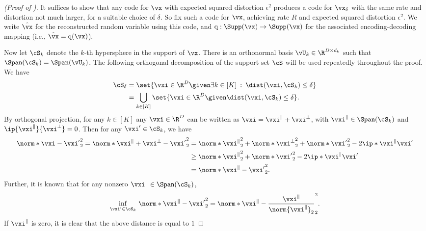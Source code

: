 \documentclass[../../book-main.tex]{subfiles}
\begin{document}
\begin{proof}[(Proof of )]
    It suffices to show that any code for $\vx$ with expected squared distortion
    $\epsilon^2$ produces a code for $\vx_{\delta}$ with the same rate and
    distortion not much larger, for a suitable choice of $\delta$.
    So fix such a code for $\vx$, achieving rate $R$ and expected squared
    distortion $\epsilon^2$. We write $\hat{\vx}$ for the reconstructed random
    variable using this code, and $\mathrm{q} : \Supp(\vx) \to \Supp(\vx)$
    for the associated encoding-decoding mapping (i.e., $\hat{\vx}
    = \mathrm{q}(\vx)$).

    Now let $\cS_k$ denote the $k$-th hypersphere in the support of $\vx$.
    There is an orthonormal basis $\vU_{k} \in \R^{D \times d_k}$ such that
    $\Span(\cS_k) = \Span(\vU_k)$.
    The following orthogonal decomposition of the support set $\cS$
    will be used repeatedly throughout the proof. 
    We have
    \begin{align}
        \cS_{\delta} 
        &= \set{\vxi \in \R^D \given \exists k \in [K] \::\: \dist(\vxi,
        \cS_k) \leq \delta}
        \\
        &= \bigcup_{k \in [K]} \set{\vxi \in \R^D \given \dist(\vxi,
        \cS_k) \leq \delta}.
    \end{align}
    By orthogonal projection, for any $k \in [K]$ any $\vxi \in \R^D$ can be
    written as $\vxi = \vxi^{\|} + \vxi^{\perp}$, with $\vxi^{\|} \in \Span(\cS_k)$
    and $\ip{\vxi^{\|}}{\vxi^\perp} = 0$.
    Then for any $\vxi' \in \cS_k$, we have
    \begin{align}
        \norm*{\vxi - \vxi'}_2^2 
        = 
        \norm*{\vxi^{\|} + \vxi^{\perp} - \vxi'}_2^2
        &=
        \norm*{\vxi^{\|}}_2^2 + \norm*{\vxi^{\perp}}_2^2 + \norm*{\vxi'}_2^2
        - 2 \ip*{\vxi^{\|}}{\vxi'}
        \\
        &\geq
        \norm*{\vxi^{\|}}_2^2 + \norm*{\vxi'}_2^2
        - 2 \ip*{\vxi^{\|}}{\vxi'}
        \\
        &=
        \norm*{\vxi^{\|} - \vxi'}_2^2.
    \end{align}
    Further, it is known that for any nonzero $\vxi^{\|} \in \Span(\cS_k)$,
    \begin{equation}
        \inf_{\vxi' \in \cS_k}\,
        \norm*{\vxi^{\|} - \vxi'}_2^2
        =
        \norm*{\vxi^{\|} - \frac{\vxi^{\|}}{\norm{\vxi^{\|}}_2}}_2^2.
    \end{equation}
    If $\vxi^{\|}$ is zero, it is clear that the above distance is equal to $1$

\end{proof}
\end{document}
